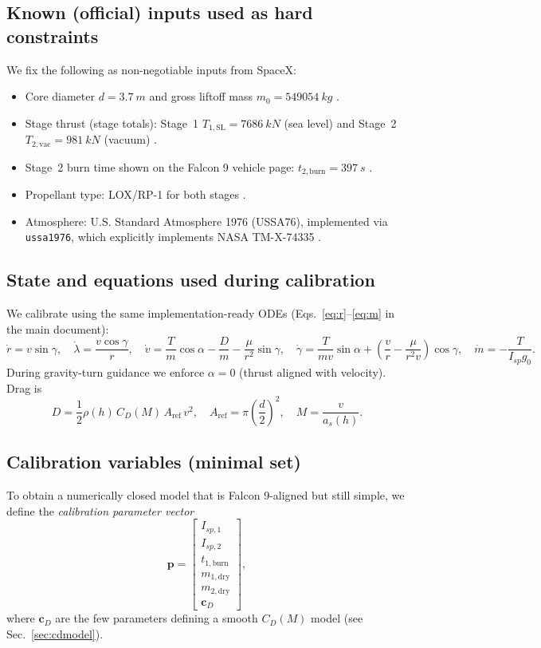\documentclass[11pt]{article}
\begin{document}
\subsection{Known (official) inputs used as hard constraints}
We fix the following as non-negotiable inputs from SpaceX:
\begin{itemize}
\item Core diameter $d=\SI{3.7}{m}$ and gross liftoff mass $m_0=\SI{549054}{kg}$ \cite{SpaceX_F9_Web}.
\item Stage thrust (stage totals): Stage~1 $T_{1,\text{SL}}=\SI{7686}{kN}$ (sea level) and Stage~2 $T_{2,\text{vac}}=\SI{981}{kN}$ (vacuum) \cite{SpaceX_UsersGuide_2025}.
\item Stage~2 burn time shown on the Falcon 9 vehicle page: $t_{2,\text{burn}}=\SI{397}{s}$ \cite{SpaceX_F9_Web}.
\item Propellant type: LOX/RP-1 for both stages \cite{SpaceX_UsersGuide_2025}.
\item Atmosphere: U.S. Standard Atmosphere 1976 (USSA76), implemented via \texttt{ussa1976}, which explicitly implements NASA TM-X-74335 \cite{NASA_USSA76,PyPI_USSA1976}.
\end{itemize}

\subsection{State and equations used during calibration}
We calibrate using the same implementation-ready ODEs (Eqs.~\eqref{eq:r}--\eqref{eq:m} in the main document):
\[
\dot r=v\sin\gamma,\quad
\dot\lambda=\frac{v\cos\gamma}{r},\quad
\dot v=\frac{T}{m}\cos\alpha-\frac{D}{m}-\frac{\mu}{r^2}\sin\gamma,\quad
\dot\gamma=\frac{T}{mv}\sin\alpha+\left(\frac{v}{r}-\frac{\mu}{r^2v}\right)\cos\gamma,\quad
\dot m=-\frac{T}{I_{sp}g_0}.
\]
During gravity-turn guidance we enforce $\alpha=0$ (thrust aligned with velocity). Drag is
\[
D=\frac{1}{2}\rho(h)\,C_D(M)\,A_{\text{ref}}\,v^2,\quad
A_{\text{ref}}=\pi\left(\frac{d}{2}\right)^2,
\quad M=\frac{v}{a_s(h)}.
\]

\subsection{Calibration variables (minimal set)}
To obtain a numerically closed model that is Falcon 9-aligned but still simple, we define the \emph{calibration parameter vector}
\begin{equation}
\bm{p}=
\begin{bmatrix}
I_{sp,1} \\
I_{sp,2} \\
t_{1,\text{burn}} \\
m_{1,\text{dry}} \\
m_{2,\text{dry}} \\
\bm{c}_{D}
\end{bmatrix},
\end{equation}
where $\bm{c}_D$ are the few parameters defining a smooth $C_D(M)$ model (see Sec.~\ref{sec:cdmodel}).
\end{document}
